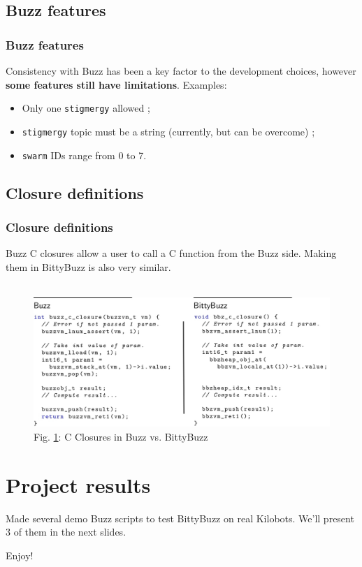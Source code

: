\documentclass{beamer}
\begin{document}
	\subsection{Buzz features}
	\begin{frame}
		\frametitle{Buzz features}
		Consistency with Buzz has been a key factor to the development choices, however \textbf{some features still have limitations}. Examples:
		\begin{itemize}
			\item Only one \texttt{stigmergy} allowed ;
			\item \texttt{stigmergy} topic must be a string (currently, but can be overcome) ;
			\item \texttt{swarm} IDs range from 0 to 7.
		\end{itemize}
	\end{frame}
	\textsl{\textsl{}}\subsection{Closure definitions}
	\begin{frame}
		\frametitle{Closure definitions}
		Buzz C closures allow a user to call a C function from the Buzz side. Making them in BittyBuzz is also very similar.\\
		~\\
		\begin{figure}
			\includegraphics[width=1\textwidth]{ClosureDefinitions}
			\caption{\label{figure:C Closures}Fig. \ref{figure:C Closures}: C Closures in Buzz vs. BittyBuzz}
		\end{figure}
	\end{frame}
	\section{Project results}
	\begin{frame}
		Made several demo Buzz scripts to test BittyBuzz on real Kilobots.
		We'll present 3 of them in the next slides.\par
		\centering
		\LARGE Enjoy!
	\end{frame}
\end{document}

